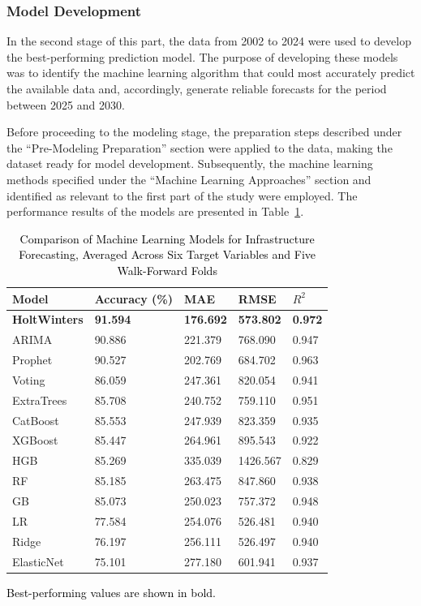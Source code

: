 \documentclass[final, 9pt, twocolumn]{saucis}
\newcommand{\rev}[1]{\textcolor{black}{#1}}
\begin{document}
\subsubsection{Model Development}

In the second stage of this part, the data from 2002 to 2024 were used to develop the best-performing prediction model. The purpose of developing these models was to identify the machine learning algorithm that could most accurately predict the available data and, accordingly, generate reliable forecasts for the period between 2025 and 2030.

Before proceeding to the modeling stage, the preparation steps described under the “Pre-Modeling Preparation” section were applied to the data, making the dataset ready for model development. Subsequently, the machine learning methods specified under the “Machine Learning Approaches” section and identified as relevant to the first part of the study were employed. The performance results of the models are presented in Table~\ref{tab:model_comparison}.

\begin{table}[htbp]
\begin{threeparttable}
\centering
\caption{\rev{Comparison of Machine Learning Models for Infrastructure Forecasting, Averaged Across Six Target Variables and Five Walk-Forward Folds}}
\label{tab:model_comparison}
\small
\begin{tabular}{p{1.8cm} p{1.2cm} p{1.2cm} p{1.3cm} p{1.1cm}}
\hline
Model & Accuracy (\%) & MAE & RMSE & $R^{2}$ \\
\hline
\textbf{HoltWinters} & \textbf{91.594} & \textbf{176.692} & \textbf{573.802} & \textbf{0.972} \\
ARIMA                & 90.886 & 221.379 &  768.090 & 0.947 \\
Prophet              & 90.527 & 202.769 &  684.702 & 0.963 \\
Voting               & 86.059 & 247.361 &  820.054 & 0.941 \\
ExtraTrees           & 85.708 & 240.752 &  759.110 & 0.951 \\
CatBoost             & 85.553 & 247.939 &  823.359 & 0.935 \\
XGBoost              & 85.447 & 264.961 &  895.543 & 0.922 \\
HGB & 85.269 & 335.039 & 1426.567 & 0.829 \\
RF         & 85.185 & 263.475 &  847.860 & 0.938 \\
GB     & 85.073 & 250.023 &  757.372 & 0.948 \\
LR     & 77.584 & 254.076 &  526.481 & 0.940 \\
Ridge                & 76.197 & 256.111 &  526.497 & 0.940 \\
ElasticNet           & 75.101 & 277.180 &  601.941 & 0.937 \\
\hline
\end{tabular}
\begin{tablenotes}
\footnotesize
\item \rev{Best-performing values are shown in bold.}
\end{tablenotes}
\end{threeparttable}
\end{table}
\end{document}

